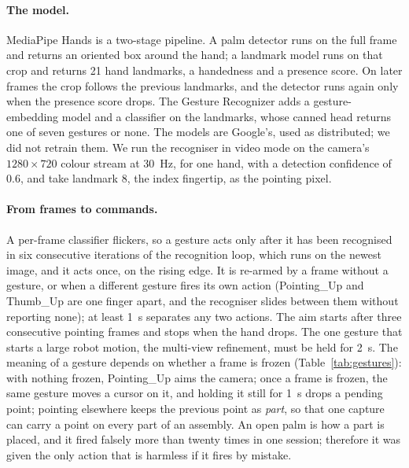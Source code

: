 \paragraph{The model.} MediaPipe Hands is a two-stage pipeline. A palm detector runs on the full
frame and returns an oriented box around the hand; a landmark model runs on that crop and returns
21 hand landmarks, a handedness and a presence score. On later frames the crop follows the
previous landmarks, and the detector runs again only when the presence score drops. The Gesture
Recognizer adds a gesture-embedding model and a classifier on the landmarks, whose canned head
returns one of seven gestures or none. The models are Google's, used as distributed; we did not
retrain them. We run the recogniser in video mode on the camera's $1280\times720$ colour stream
at 30~Hz, for one hand, with a detection confidence of 0.6, and take landmark 8, the index
fingertip, as the pointing pixel.

\paragraph{From frames to commands.} A per-frame classifier flickers, so a gesture acts only
after it has been recognised in six consecutive iterations of the recognition loop, which runs on
the newest image, and it acts once, on the rising edge. It is re-armed by a frame without a
gesture, or when a different gesture fires its own action (Pointing\_Up and Thumb\_Up are one
finger apart, and the recogniser slides between them without reporting none); at least 1~s
separates any two actions. The aim starts after three consecutive pointing frames and stops when the
hand drops. The one gesture that starts a large robot motion, the multi-view refinement, must be
held for 2~s. The meaning of a gesture depends on whether a frame is frozen
(Table~\ref{tab:gestures}): with nothing frozen, Pointing\_Up aims the camera; once a frame is
frozen, the same gesture moves a cursor on it, and holding it still for 1~s drops a pending point;
pointing elsewhere keeps the previous point as \emph{part}, so that one capture can carry a point
on every part of an assembly. An open
palm is how a part is placed, and it fired falsely more than twenty times in one session;
therefore it was given the only action that is harmless if it fires by mistake.

